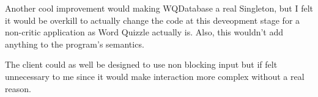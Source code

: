 \documentclass[a4paper,11pt]{article}
\begin{document}
\begin{appendices}
Another cool improvement would making WQDatabase a real Singleton, but I felt it would be overkill to actually change the code at this deveopment stage for a non-critic application as Word Quizzle actually is. Also, this wouldn't add anything to the program's semantics.

The client could as well be designed to use non blocking input but if felt unnecessary to me since it would make interaction more complex without a real reason.

\end{appendices}    
\end{document}
